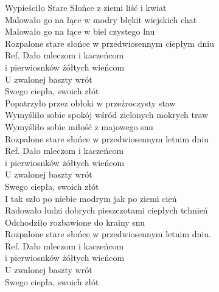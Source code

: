 
\begin{flushleft}
Wypieściło Stare Słońce z ziemi liść i kwiat \tab{} \\
Malowało go na łące w modry błękit wiejskich chat  \\
Malowało go na łące w biel czystego lnu \tab{} \\
Rozpalone stare słońce w przedwiosennym ciepłym dniu \\
\vskip 3mm
Ref. Dało mleczom i kaczeńcom  \\
\hspace{0.9cm}i pierwiosnków żółtych wieńcom \\
\hspace{0.9cm}U zwalonej baszty wrót \tab{} \\
\hspace{0.9cm}Swego ciepła, swoich złót \tab{} \\
\vskip 3mm
Popatrzyło przez obłoki w przeźroczysty staw\\
Wymyśliło sobie spokój wśród zielonych mokrych traw\\
Wymyśliło sobie miłość z majowego snu \\
Rozpalone stare słońce w przedwiosennym letnim dniu\\
\vskip 3mm
Ref. Dało mleczom i kaczeńcom\\
\hspace{0.9cm}i pierwiosnków żółtych wieńcom\\
\hspace{0.9cm}U zwalonej baszty wrót\\
\hspace{0.9cm}Swego ciepła, swoich złót\\
\vskip 3mm
I tak szło po niebie modrym jak po ziemi cień \\
Radowało ludzi dobrych pieszczotami ciepłych tchnień\\
Odchodziło rozbawione do krainy snu   \\
Rozpalone stare słońce w przedwiosennym letnim dniu.\\
\vskip 3mm
Ref. Dało mleczom i kaczeńcom\\
\hspace{0.9cm}i pierwiosnków żółtych wieńcom\\
\hspace{0.9cm}U zwalonej baszty wrót\\
\hspace{0.9cm}Swego ciepła, swoich złót\\
\end{flushleft}
\clearpage
